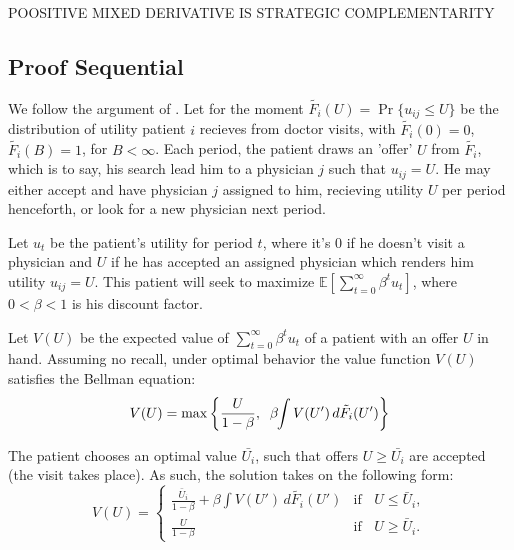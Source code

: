 \documentclass[../main.tex]{subfiles}
\begin{document}
POOSITIVE MIXED DERIVATIVE IS STRATEGIC COMPLEMENTARITY

\subsection{Proof Sequential}

We follow the argument of \cite{sargent}. Let for the moment $\tilde{F_i}(U) = \operatorname{Pr}\{u_{ij} \leq U\}$ be the distribution of utility patient $i$ recieves from doctor visits, with $\tilde{F_i}(0) = 0$, $\tilde{F_i}(B) = 1$, for $B < \infty$. Each period, the patient draws an 'offer' $U$ from $\tilde{F_i}$, which is to say, his search lead him to a physician $j$ such that $u_{ij} = U$. He may either accept and have physician $j$ assigned to him, recieving utility $U$ per period henceforth, or look for a new physician next period.

Let $u_t$ be the patient's utility for period $t$, where it's $0$ if he doesn't visit a physician and $U$ if he has accepted an assigned physician which renders him utility $u_{ij} = U$. This patient will seek to maximize $\mathbb{E}[\sum_{t=0}^{\infty} \beta^t u_t]$, where $0 < \beta < 1$ is his discount factor.

Let $V(U)$ be the expected value of $\sum_{t=0}^{\infty} \beta^t u_t$ of a patient with an offer $U$ in hand. Assuming no recall, under optimal behavior the value function $V(U)$ satisfies the Bellman equation:
\begin{equation}
    V(U) = \max \left\{ \frac{U}{1 - \beta},\; \;\beta \hspace{-0.1cm}\int V(U') \, d \tilde{F_i}(U') \right\}
    \label{eq:seq1} 
\end{equation}

The patient chooses an optimal value $\bar{U_i}$, such that offers $U \geq \bar{U_i}$ are accepted (the visit takes place). As such, the solution takes on the following form:
\begin{equation}
    V(U) = \begin{cases}
        \frac{\bar{U}_i}{1 - \beta} + \beta \int V(U') \, d \tilde{F_i}(U') & \text{if }\; \; U \leq \bar{U}_i, \\[0.5em]
        \frac{U}{1 - \beta} & \text{if } \; \; U \geq \bar{U}_i.
    \end{cases}
\label{eq:seq2} 
\end{equation}
\end{document}

